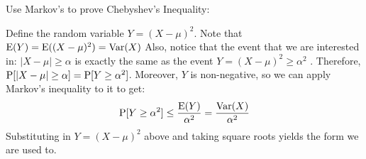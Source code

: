 \question Use Markov's to prove Chebyshev's Inequality:
\begin{solution}[5cm]
Define the random variable $Y = (X - \mu)^2$. Note that \newline 
$\E(Y) =\E((X - \mu)^2) = \var(X)$
Also, notice that the event that we are interested in: $|X - \mu| \geq \alpha$ is exactly the same as the event $Y = (X - \mu)^2 \geq \alpha ^2$ .
Therefore, $\P[|X -\mu| \geq \alpha] = \P[Y \geq \alpha^2 ]$. \newline 
Moreover, $Y$ is non-negative, so we can apply Markov's inequality to it to get: 
\[\P[Y \geq \alpha^2] \leq \frac{\E(Y)}{\alpha^2} = \frac{\var(X)}{\alpha^2}\]
Substituting in $Y = (X-\mu)^2$ above and taking square roots yields the form we are used to.
\end{solution}
